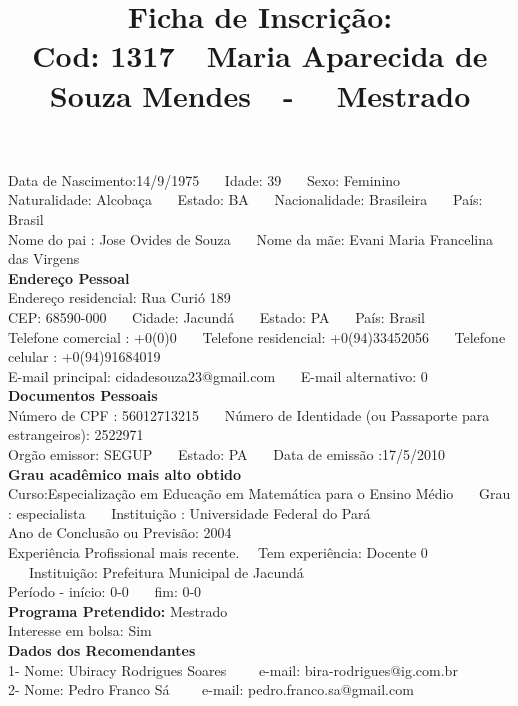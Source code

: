 \documentclass[11pt]{article}
\title{\vspace*{-4cm} Ficha de Inscrição: \\Cod: 1317\ \ Maria Aparecida  de Souza Mendes\ \ - \ \ Mestrado 
 }
\date{}
\begin{document}
\maketitle
\vspace*{-1.5cm}
\noindent Data de Nascimento:14/9/1975
\ \ \ Idade: 39   \ \ \ Sexo: Feminino
\\
Naturalidade: Alcobaça  
\ \ \  Estado: BA
\ \ \  Nacionalidade: Brasileira
\ \ \ País: Brasil
\\        
Nome do pai : Jose Ovides de Souza
\ \ \ Nome da mãe: Evani Maria Francelina das Virgens          
\\[0.2cm]                     
\textbf{Endereço Pessoal} 
\\ 
\noindent Endereço residencial: Rua Curió  189
\\
        CEP: 68590-000 
\ \ \ Cidade: Jacundá 
\ \ \ Estado: PA 
\ \ \ País: Brasil
\\		
		Telefone comercial : +0(0)0
\ \ \ Telefone residencial: +0(94)33452056
\ \ \ Telefone celular : +0(94)91684019
\\
E-mail principal: cidadesouza23@gmail.com
\ \ \ E-mail alternativo: 0 
\\[0.2cm] 
\textbf{Documentos Pessoais}
\\
\noindent Número de CPF : 56012713215
\ \ \ Número de Identidade (ou Passaporte para estrangeiros): 2522971
\\
Orgão emissor: SEGUP
\ \ \ Estado: PA
\ \ \ Data de emissão :17/5/2010
\\[0.3cm]
\textbf{Grau acadêmico mais alto obtido}
\\	
Curso:Especialização em Educação em Matemática para o Ensino Médio
\ \ \ Grau : especialista
\ \ \ Instituição : Universidade Federal do Pará
\\			
Ano de Conclusão ou Previsão: 2004
\\ 
Experiência Profissional mais recente. \ \  
Tem experiência: Docente 0  
\ \ \ Instituição: Prefeitura Municipal de Jacundá
\\  
Período - início: 0-0
\ \ \ fim: 0-0
\\[0.2cm] 
\textbf{Programa Pretendido:} Mestrado\\
Interesse em bolsa: Sim
\\[0.3cm]		
\textbf{Dados dos Recomendantes} 
\\
1- Nome: Ubiracy Rodrigues Soares
\ \ \ \  e-mail: bira-rodrigues@ig.com.br 
\\
2- Nome: Pedro Franco Sá
\ \ \ \ e-mail: pedro.franco.sa@gmail.com
\end{document}
